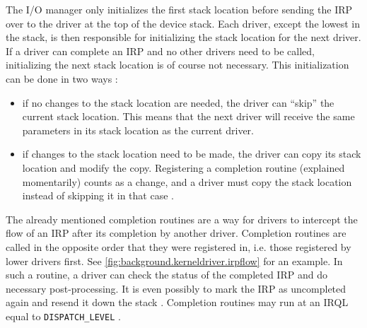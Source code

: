 The I/O manager only initializes the first stack location before sending the IRP over to the driver at the top of the device stack. Each driver, except the lowest in the stack, is then responsible for initializing the stack location for the next driver. If a driver can complete an IRP and no other drivers need to be called, initializing the next stack location is of course not necessary. This initialization can be done in two ways \cite{Yosifovich2017}:
\begin{itemize}
	\item if no changes to the stack location are needed, the driver can ``skip'' the current stack location. This means that the next driver will receive the same parameters in its stack location as the current driver.
	\item if changes to the stack location need to be made, the driver can copy its stack location and modify the copy. Registering a completion routine (explained momentarily) counts as a change, and a driver must copy the stack location instead of skipping it in that case \cite{Wdk}.
\end{itemize}

The already mentioned completion routines are a way for drivers to intercept the flow of an IRP after its completion by another driver. Completion routines are called in the opposite order that they were registered in, i.e. those registered by lower drivers first. See \autoref{fig:background.kerneldriver.irpflow} for an example. In such a routine, a driver can check the status of the completed IRP and do necessary post-processing. It is even possibly to mark the IRP as uncompleted again and resend it down the stack \cite{Yosifovich2017}. Completion routines may run at an IRQL equal to \texttt{DISPATCH\_LEVEL} \cite{Wdk}.

